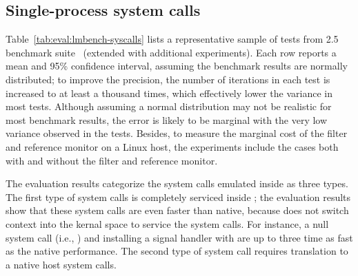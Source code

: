 \subsection{Single-process system calls}
\label{eval:perf:syscalls}


Table~\ref{tab:eval:lmbench-syscalls} lists 
a representative sample of 
tests from \lmbench{} 2.5 benchmark suite~\cite{McVoy:lmbench}
(extended with additional experiments).
Each row reports a mean and 95\% confidence interval,
assuming the benchmark results are normally distributed;
to improve the precision,
the number of iterations in each test is increased to at least a thousand times, which effectively lower the variance
in most tests.
Although assuming a normal distribution may not be realistic for most benchmark results,
the error is likely to be marginal with the very low variance
observed in the tests.
Besides, to measure the marginal cost of the \seccomp{} filter and reference monitor on a Linux host,
the experiments include the cases both with
and without the \seccomp{} filter and reference monitor.


The evaluation results categorize
the system calls emulated inside \thelibos{}
as three types.
The first type of system calls is completely serviced inside \thelibos{};
the evaluation results show that these system calls are even faster than native, because \thelibos{} does not switch context into the kernal space
to service the system calls.
For instance,
a null system call (i.e., ) and installing a signal handler with 
are up to three time as fast as the native performance.
The second type of system call requires translation to a native host system calls.

